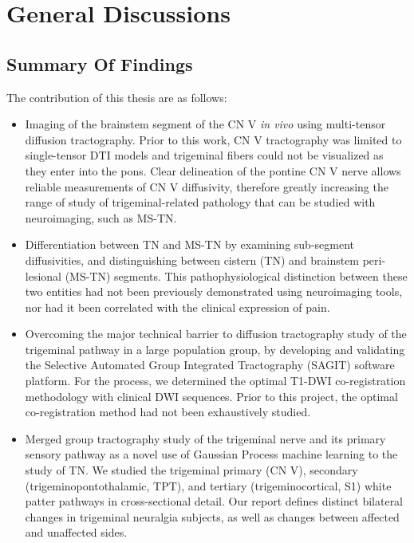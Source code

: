 \graphicspath{{images/discussions/}}

\chapter{General Discussions}

\section{Summary Of Findings}

The contribution of this thesis are as follows:

\begin{itemize}

\item Imaging of the brainstem segment of the CN V \textit{in vivo} using multi-tensor diffusion tractography. Prior to this work, CN V tractography was limited to single-tensor DTI models and trigeminal fibers could not be visualized as they enter into the pons. Clear delineation of the pontine CN V nerve allows reliable measurements of CN V diffusivity, therefore greatly increasing the range of study of trigeminal-related pathology that can be studied with neuroimaging, such as MS-TN. 

\item Differentiation between TN and MS-TN by examining sub-segment diffusivities, and distinguishing between cistern (TN) and brainstem peri-lesional (MS-TN) segments. This pathophysiological distinction between these two entities had not been previously demonstrated using neuroimaging tools, nor had it been correlated with the clinical expression of pain. 

\item Overcoming the major technical barrier to diffusion tractography study of the trigeminal pathway in a large population group, by developing and validating the Selective Automated Group Integrated Tractography (SAGIT) software platform. For the process, we determined the optimal T1-DWI co-registration methodology with clinical DWI sequences. Prior to this project, the optimal co-registration method had not been exhaustively studied.

\item Merged group tractography study of the trigeminal nerve and its primary sensory pathway as a novel use of Gaussian Process machine learning to the study of TN. We studied the trigeminal primary (CN V), secondary (trigeminopontothalamic, TPT), and tertiary (trigeminocortical, S1) white patter pathways in cross-sectional detail. Our report defines distinct bilateral changes in trigeminal neuralgia subjects, as well as changes between affected and unaffected sides. 

\end{itemize}

